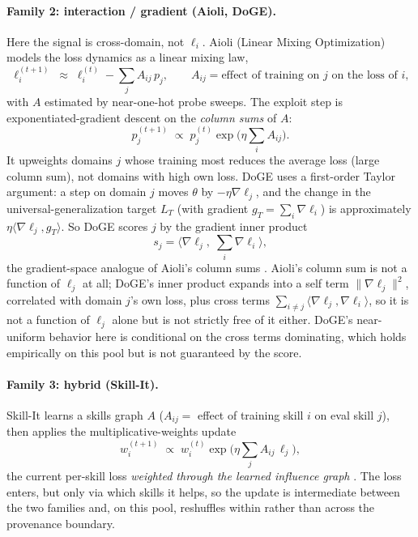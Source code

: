 \documentclass{article}
\begin{document}
\paragraph{Family 2: interaction / gradient (Aioli, DoGE).} Here the signal is cross-domain, not $\ell_i$. Aioli (Linear Mixing Optimization) models the loss dynamics as a linear mixing law,
\begin{equation}
\ell_i^{(t+1)} \;\approx\; \ell_i^{(t)} - \sum_{j} A_{ij}\, p_j ,
\qquad A_{ij} = \text{effect of training on } j \text{ on the loss of } i ,
\label{eq:aioli-law}
\end{equation}
with $A$ estimated by near-one-hot probe sweeps. The exploit step is exponentiated-gradient descent on the \emph{column sums} of $A$:
\begin{equation}
p_j^{(t+1)} \;\propto\; p_j^{(t)} \exp\!\Big(\eta \textstyle\sum_i A_{ij}\Big) .
\label{eq:aioli-egd}
\end{equation}
It upweights domains $j$ whose training most reduces the average loss (large column sum), not domains with high own loss. DoGE uses a first-order Taylor argument: a step on domain $j$ moves $\theta$ by $-\eta \nabla \ell_j$, and the change in the universal-generalization target $L_T$ (with gradient $g_T = \sum_i \nabla \ell_i$) is approximately $\eta \langle \nabla \ell_j, g_T \rangle$. So DoGE scores $j$ by the gradient inner product
\begin{equation}
s_j = \Big\langle \nabla \ell_j, \; \textstyle\sum_i \nabla \ell_i \Big\rangle ,
\label{eq:doge}
\end{equation}
the gradient-space analogue of Aioli's column sums \citep{aioli2024, doge2024}. Aioli's column sum is not a function of $\ell_j$ at all; DoGE's inner product expands into a self term $\lVert\nabla\ell_j\rVert^2$, correlated with domain $j$'s own loss, plus cross terms $\sum_{i\neq j}\langle\nabla\ell_j,\nabla\ell_i\rangle$, so it is not a function of $\ell_j$ alone but is not strictly free of it either. DoGE's near-uniform behavior here is conditional on the cross terms dominating, which holds empirically on this pool but is not guaranteed by the score.

\paragraph{Family 3: hybrid (Skill-It).} Skill-It learns a skills graph $A$ ($A_{ij} =$ effect of training skill $i$ on eval skill $j$), then applies the multiplicative-weights update
\begin{equation}
w_i^{(t+1)} \;\propto\; w_i^{(t)} \exp\!\Big(\eta \textstyle\sum_j A_{ij}\, \ell_j\Big),
\label{eq:skillit}
\end{equation}
the current per-skill loss \emph{weighted through the learned influence graph} \citep{skillit2023}. The loss enters, but only via which skills it helps, so the update is intermediate between the two families and, on this pool, reshuffles within rather than across the provenance boundary.
\end{document}

